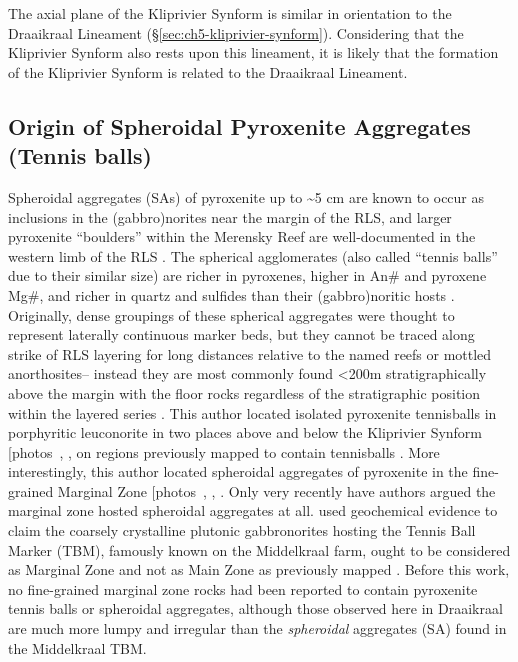 The axial plane of the Kliprivier Synform is similar in orientation to the
Draaikraal Lineament (\S\ref{sec:ch5-kliprivier-synform}). Considering that the Kliprivier Synform also rests upon this
lineament, it is likely that the formation of the Kliprivier Synform is
related to the Draaikraal Lineament.

\subsection{Origin of Spheroidal Pyroxenite Aggregates (Tennis balls)}
\label{sec:ch5-origin-of-spheroidal-pyroxenite-aggregates-tennis-balls}

Spheroidal aggregates (SAs) of pyroxenite up to \textasciitilde5 cm are
known to occur as inclusions in the (gabbro)norites near the margin of
the RLS, and larger pyroxenite ``boulders'' within the Merensky Reef are
well-documented in the western limb of the RLS \citep{lee1979,smith2023,khoza2021}. The spherical agglomerates (also
called ``tennis balls'' due to their similar size) are richer in
pyroxenes, higher in An\# and pyroxene Mg\#, and richer in quartz and
sulfides than their (gabbro)noritic hosts \citep{lee1979,khoza2021}. Originally, dense groupings of these spherical aggregates were
thought to represent laterally continuous marker beds, but they cannot
be traced along strike of RLS layering for long distances relative to
the named reefs or mottled anorthosites-- instead they are most commonly
found \textless200m stratigraphically above the margin with the floor
rocks regardless of the stratigraphic position within the layered
series \citep{lee1979}. This author located isolated
pyroxenite tennisballs in porphyritic leuconorite in two places above
and below the Kliprivier Synform {[}photos~, \ChFivePhoto{79}{]}, on regions
previously mapped to contain tennisballs \citep{lee1979}. More
interestingly, this author located spheroidal aggregates of pyroxenite
in the fine-grained Marginal Zone {[}photos~, , \ChFivePhoto{96}{]}. Only very
recently have authors argued the marginal zone hosted spheroidal
aggregates at all. \citet{mitchell2023} used geochemical evidence
to claim the coarsely crystalline plutonic gabbronorites hosting the
Tennis Ball Marker (TBM), famously known on the Middelkraal farm, ought
to be considered as Marginal Zone and not as Main Zone as previously
mapped \citep{lee1979,molyneux2008,khoza2021}. Before
this work, no fine-grained marginal zone rocks had been reported to contain
pyroxenite tennis balls or spheroidal aggregates, although those
observed here in Draaikraal are much more lumpy and irregular than the
\emph{spheroidal} aggregates (SA) found in the Middelkraal TBM.

